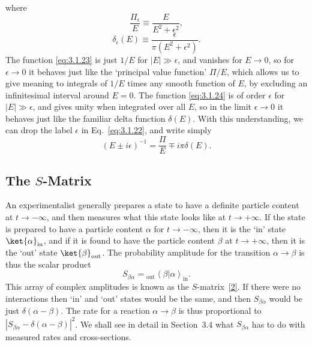 
where
\begin{equation}
\frac{\Pi_\epsilon}{E}\equiv\frac{E}{E^2+\epsilon^2},
\tag{3.1.23}\label{eq:3.1.23}
\end{equation}
\begin{equation}
\delta_\epsilon(E)\equiv\frac{\epsilon}{\pi(E^2+\epsilon^2)}.
\tag{3.1.24}\label{eq:3.1.24}
\end{equation}
The function \eqref{eq:3.1.23} is just $1/E$ for $|E|\gg\epsilon$, and vanishes for
$E\to0$, so for $\epsilon\to0$ it behaves just like the `principal value
function' $\Pi/E$, which allows us to give meaning to integrals of
$1/E$ times any smooth function of $E$, by excluding an infinitesimal
interval around $E=0$. The function \eqref{eq:3.1.24} is of order $\epsilon$ for
$|E|\gg\epsilon$, and gives unity when integrated over all $E$, so in the
limit $\epsilon\to0$ it behaves just like the familiar delta function
$\delta(E)$. With this understanding, we can drop the label $\epsilon$ in
Eq.~\eqref{eq:3.1.22}, and write simply
\begin{equation}
(E\mathbin{\pm}i\epsilon)^{-1}
=\frac{\Pi}{E}\mp i\pi\delta(E).
\tag{3.1.25}\label{eq:3.1.25}
\end{equation}

\subsection{\texorpdfstring{The $S$-Matrix}{The S-Matrix}}

An experimentalist generally prepares a state to have a definite particle
content at $t\to-\infty$, and then measures what this state looks like at
$t\to+\infty$. If the state is prepared to have a particle content $\alpha$
for $t\to-\infty$, then it is the `in' state
$\ket{\alpha}_{\mathrm{in}}$, and if it is found to have the particle content
$\beta$ at $t\to+\infty$, then it is the `out' state
$\ket{\beta}_{\mathrm{out}}$. The probability amplitude for the transition
$\alpha\to\beta$ is thus the scalar product
\begin{equation}
S_{\beta\alpha}
={}_{\mathrm{out}}\!\left\langle\beta
| \alpha\right\rangle_{\mathrm{in}}.
\tag{3.2.1}\label{eq:3.2.1}
\end{equation}
This array of complex amplitudes is known as the $S$-matrix~\hyperref[ref:3.2]{[2]}. If there
were no interactions then `in' and `out' states would be the same, and then
$S_{\beta\alpha}$ would be just $\delta(\alpha-\beta)$. The rate for a
reaction $\alpha\to\beta$ is thus proportional to
$|S_{\beta\alpha}-\delta(\alpha-\beta)|^2$. We shall see in detail in
Section~3.4 what $S_{\beta\alpha}$ has to do with measured rates and
cross-sections.

